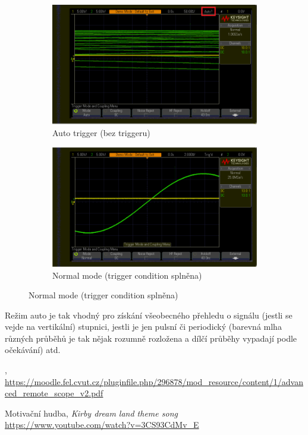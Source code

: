 \documentclass[twoside]{article}
\begin{document}
\begin{figure}[htbp]
	\centering
	\begin{subfigure}{0.45\textwidth}
		\includegraphics[width=\linewidth]{trigger_auto.png                      }
		\caption{Auto trigger (bez triggeru)}
	\end{subfigure}
	\begin{subfigure}{0.45\textwidth}
		\includegraphics[width=\linewidth]{trigger_normal.png                    }
		\caption{Normal mode (trigger condition splněna)}
	\end{subfigure}
\end{figure}

Režim auto je tak vhodný pro získání všeobecného přehledu o signálu (jestli se vejde na vertikální)
stupnici, jestli je jen pulsní či periodický (barevná mlha různých průběhů je tak nějak rozumně rozložena a dílčí průběhy
vypadají podle očekávání) atd.


	
		
		\begin{thebibliography}{9}
			
			
			, \url{https://moodle.fel.cvut.cz/pluginfile.php/296878/mod_resource/content/1/advanced_remote_scope_v2.pdf}
			
			Motivační hudba, \emph{Kirby dream land theme song} \url{https://www.youtube.com/watch?v=3CS93CdMv_E}
			
		\end{thebibliography}
		
		
\end{document}
